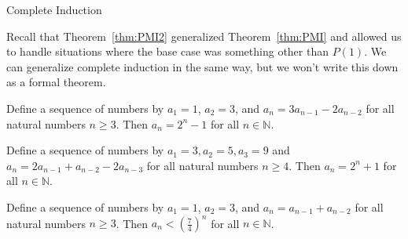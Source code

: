 \begin{section}{Complete Induction}
\begin{skeleton}
\begin{center}
\end{center}
\end{skeleton}

Recall that Theorem~\ref{thm:PMI2} generalized Theorem~\ref{thm:PMI} and allowed us to handle situations where the base case was something other than $P(1)$.  We can generalize complete induction in the same way, but we won't write this down as a formal theorem.

\begin{theorem}
Define a sequence of numbers by $a_1 = 1$, $a_2 = 3$, and $a_n = 3a_{n-1} - 2a_{n-2}$ for all natural numbers $n \geq 3$.  Then $a_n = 2^n - 1$ for all $n \in \mathbb{N}$.  
\end{theorem}

\begin{theorem}
Define a sequence of numbers by $a_1 = 3, a_2 = 5, a_3 = 9$ and $a_n = 2a_{n-1} + a_{n-2}-2a_{n-3}$ for all natural numbers $n \geq 4$.  Then $a_n = 2^n + 1$ for all $n \in \mathbb{N}$.  
\end{theorem}

\begin{theorem}
Define a sequence of numbers by $a_1=1$, $a_2=3$, and $a_n=a_{n-1}+a_{n-2}$ for all natural numbers $n \geq 3$.  Then $a_n < \left( \frac{7}{4} \right)^n$ for all $n \in \mathbb{N}$.
\end{theorem}


\end{section}
